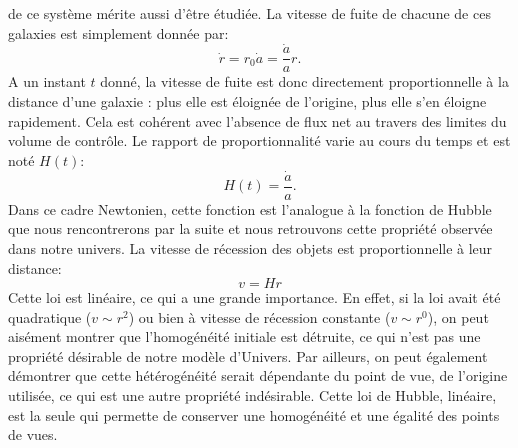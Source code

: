  de ce système mérite aussi d'être étudiée. La vitesse de fuite de chacune de ces galaxies est simplement donnée par:
\begin{equation}
\dot r= r_0 \dot a = \frac{\dot a}{a} r.
\end{equation}
A un instant $t$ donné, la vitesse de fuite est donc directement proportionnelle à la distance d'une galaxie : plus elle est éloignée de l'origine, plus elle s'en éloigne rapidement. Cela est cohérent avec l'absence de flux net au travers des limites du volume de contrôle. Le rapport de proportionnalité varie au cours du temps et est noté $H(t)$:
\begin{equation}
H(t)=\frac{\dot a}{a}.
\end{equation}
Dans ce cadre Newtonien, cette fonction est l'analogue à la fonction de Hubble  que nous rencontrerons par la suite et nous retrouvons cette propriété observée dans notre univers. La vitesse de récession des objets est proportionnelle à leur distance:
\begin{equation}
v=Hr
\label{e:hubblenewt}
\end{equation}
Cette loi est linéaire, ce qui a une grande importance. En effet, si la loi avait été quadratique ($v\sim r^2$) ou bien à vitesse de récession constante ($v\sim r^0$), on peut aisément montrer que l'homogénéité initiale est détruite, ce qui n'est pas une propriété désirable de notre modèle d'Univers. Par ailleurs, on peut également démontrer que cette hétérogénéité serait dépendante du point de vue, de l'origine utilisée, ce qui est une autre propriété indésirable. Cette loi de Hubble, linéaire, est la seule qui permette de conserver une homogénéité et une égalité des points de vues.

